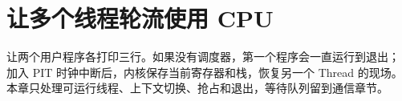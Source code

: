 \chapter{让多个线程轮流使用 CPU}

让两个用户程序各打印三行。如果没有调度器，第一个程序会一直运行到退出；
加入 PIT 时钟中断后，内核保存当前寄存器和栈，恢复另一个 Thread 的现场。
本章只处理可运行线程、上下文切换、抢占和退出，等待队列留到通信章节。




